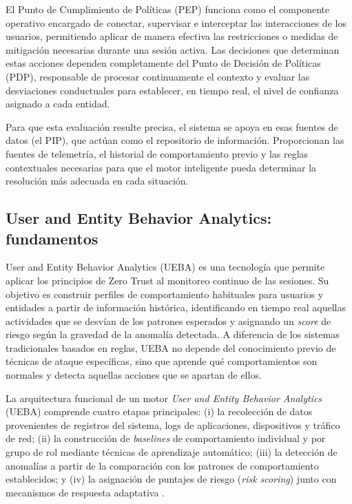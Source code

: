 El Punto de Cumplimiento de Políticas (PEP) funciona como el componente operativo encargado de conectar, supervisar e interceptar las interacciones de los usuarios, permitiendo aplicar de manera efectiva las restricciones o medidas de mitigación necesarias durante una sesión activa. Las decisiones que determinan estas acciones dependen completamente del Punto de Decisión de Políticas (PDP), responsable de procesar continuamente el contexto y evaluar las desviaciones conductuales para establecer, en tiempo real, el nivel de confianza asignado a cada entidad.

Para que esta evaluación resulte precisa, el sistema se apoya en esas fuentes de datos (el PIP), que actúan como el repositorio de información. Proporcionan las fuentes de telemetría, el historial de comportamiento previo y las reglas contextuales necesarias para que el motor inteligente pueda determinar la resolución más adecuada en cada situación.


\subsection{User and Entity Behavior Analytics: fundamentos}
User and Entity Behavior Analytics (UEBA) es una tecnología que permite aplicar los principios de Zero Trust al monitoreo continuo de las sesiones. Su objetivo es construir perfiles de comportamiento habituales para usuarios y entidades a partir de información histórica, identificando en tiempo real aquellas actividades que se desvían de los patrones esperados y asignando un \emph{score} de riesgo según la gravedad de la anomalía detectada. A diferencia de los sistemas tradicionales basados en reglas, UEBA no depende del conocimiento previo de técnicas de ataque específicas, sino que aprende qué comportamientos son normales y detecta aquellas acciones que se apartan de ellos. 

La arquitectura funcional de un motor \emph{User and Entity Behavior Analytics} (UEBA) comprende cuatro etapas principales: (i) la recolección de datos provenientes de registros del sistema, logs de aplicaciones, dispositivos y tráfico de red; (ii) la construcción de \emph{baselines} de comportamiento individual y por grupo de rol mediante técnicas de aprendizaje automático; (iii) la detección de anomalías a partir de la comparación con los patrones de comportamiento establecidos; y (iv) la asignación de puntajes de riesgo (\emph{risk scoring}) junto con mecanismos de respuesta adaptativa \parencite{Artioli2024}.

